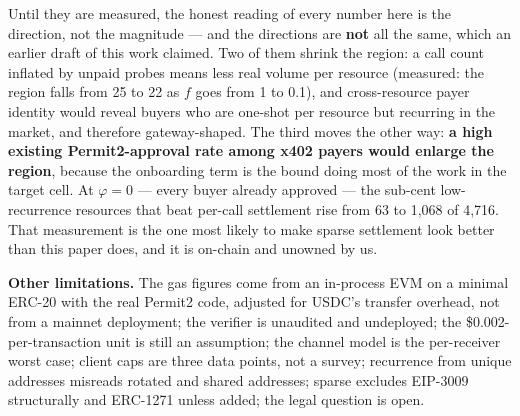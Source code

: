 \documentclass[11pt,a4paper]{article}
\newcommand{\code}[1]{\texttt{\seqbreak{#1}}}
\newcommand{\seqbreak}[1]{\begingroup\lccode`~=`/ \lowercase{\def~{/\allowbreak}}%
  \lccode`~=`. \lowercase{\def~{.\allowbreak}}%
  \lccode`~=`- \lowercase{\def~{-\allowbreak}}%
  \lccode`~=`_ \lowercase{\def~{\textunderscore\allowbreak}}%
  \catcode`/=13 \catcode`.=13 \catcode`-=13 \catcode`_=13 \scantokens{#1\noexpand}\endgroup}
\newcommand{\dollar}[1]{\$#1}
\begin{document}

Until they are measured, the honest reading of every number here is the direction, not the magnitude --- and the
directions are \textbf{not} all the same, which an earlier draft of this work claimed. Two of them shrink the
region: a call count inflated by unpaid probes means less real volume per resource (measured: the region falls
from 25 to 22 as $f$ goes from 1 to 0.1), and cross-resource payer identity would reveal buyers who are one-shot
per resource but recurring in the market, and therefore gateway-shaped. The third moves the other way:
\textbf{a high existing Permit2-approval rate among x402 payers would enlarge the region}, because the
onboarding term is the bound doing most of the work in the target cell. At $\varphi = 0$ --- every buyer already
approved --- the sub-cent low-recurrence resources that beat per-call settlement rise from 63 to 1,068 of 4,716.
That measurement is the one most likely to make sparse settlement look better than this paper does, and it is
on-chain and unowned by us.

\textbf{Other limitations.} The gas figures come from an in-process EVM on a minimal ERC-20 with the real Permit2
code, adjusted for USDC's transfer overhead, not from a mainnet deployment; the verifier is unaudited and
undeployed; the \dollar{0.002}-per-transaction unit is still an assumption; the channel model is the per-receiver
worst case; client caps are three data points, not a survey; recurrence from unique addresses misreads rotated
and shared addresses; sparse excludes EIP-3009 structurally and ERC-1271 unless added; the legal question is
open.
\end{document}
